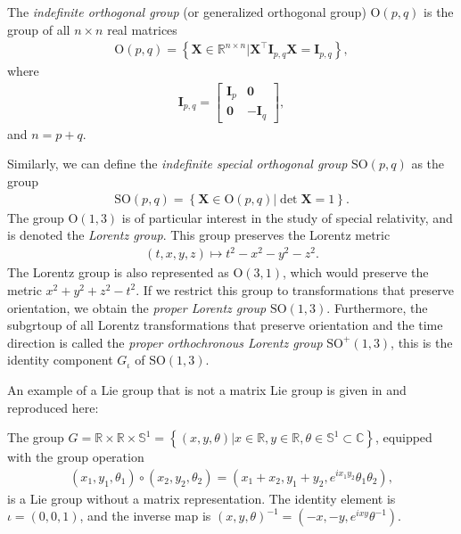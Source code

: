 \begin{example}
    The \emph{indefinite orthogonal group} (or generalized orthogonal group) $\text{O}(p,q)$ is the group of all $n\times n$ real matrices
    \begin{align}
        \text{O}(p,q) = \left\{\mathbf{X}\in\mathbb{R}^{n\times n} | \mathbf{X}^\top\mathbf{I}_{p,q}\mathbf{X} = \mathbf{I}_{p,q}\right\},
    \end{align}
    where
    \begin{align}
        \mathbf{I}_{p,q} = \begin{bmatrix}
            \mathbf{I}_p & \mathbf{0}\\
            \mathbf{0} & -\mathbf{I}_q
        \end{bmatrix},
    \end{align}
    and $n=p+q$.

    Similarly, we can define the \emph{indefinite special orthogonal group} $\text{SO}(p,q)$ as the group
    \begin{align}
        \text{SO}(p, q) = \left\{\mathbf{X}\in\text{O}(p, q) | \det\mathbf{X}=1\right\}.
    \end{align}
    The group $\text{O}(1,3)$ is of particular interest in the study of special relativity, and is denoted the \emph{Lorentz group}. This group preserves the Lorentz metric
    \begin{align}
        (t,x,y,z) \mapsto t^2 - x^2 - y^2 - z^2.
    \end{align}
    The Lorentz group is also represented as $\text{O}(3,1)$, which would preserve the metric $x^2 + y^2 + z^2 - t^2$.
    If we restrict this group to transformations that preserve orientation, we obtain the \emph{proper Lorentz group} $\text{SO}(1,3)$. Furthermore, the subgrtoup of all Lorentz transformations that preserve orientation and the time direction is called the  \emph{proper orthochronous Lorentz group} $\text{SO}^+(1,3)$, this is the identity component $G_\iota$ of $\text{SO}(1,3)$.
    
\end{example}
\begin{example}\label{ex:non-matrix-lie-group}
    An example of a Lie group that is not a matrix Lie group is given in \citet[p. 25]{Hall2015} and reproduced here:

    The group $G = \mathbb{R} \times \mathbb{R} \times \mathbb{S}^1 = \left\{(x, y, \theta) | x \in \mathbb{R}, y \in \mathbb{R}, \theta \in \mathbb{S}^1\subset\mathbb{C}\right\}$, equipped with the group operation
    \begin{align}
        (x_1, y_1, \theta_1)\circ (x_2, y_2, \theta_2) = (x_1 + x_2, y_1 + y_2, e^{ix_1y_2}\theta_1\theta_2),
    \end{align}
    is a Lie group without a matrix representation. The identity element is $\iota=(0, 0, 1)$, and the inverse map is $(x, y, \theta)^{-1} = (-x, -y, e^{ixy}\theta^{-1})$.
\end{example} 

